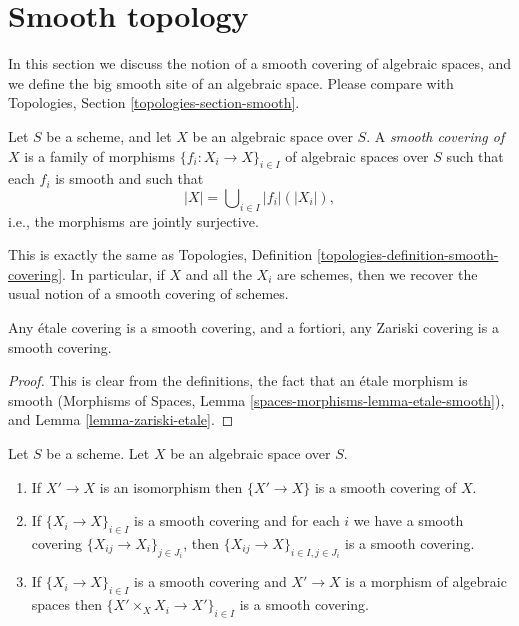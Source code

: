\section{Smooth topology}
\label{section-smooth}

\noindent
In this section we discuss the notion of a smooth covering of
algebraic spaces, and we define the big smooth site of an
algebraic space. Please compare with
Topologies, Section \ref{topologies-section-smooth}.

\begin{definition}
\label{definition-smooth-covering}
Let $S$ be a scheme, and let $X$ be an algebraic space over $S$.
A {\it smooth covering of $X$} is a family of morphisms
$\{f_i : X_i \to X\}_{i \in I}$ of algebraic spaces over $S$
such that each $f_i$ is smooth
and such that
$$
|X| = \bigcup\nolimits_{i \in I} |f_i|(|X_i|),
$$
i.e., the morphisms are jointly surjective.
\end{definition}

\noindent
This is exactly the same as
Topologies, Definition \ref{topologies-definition-smooth-covering}.
In particular, if $X$ and all the $X_i$ are schemes, then we recover the
usual notion of a smooth covering of schemes.

\begin{lemma}
\label{lemma-zariski-etale-smooth}
Any \'etale covering is a smooth covering, and a fortiori,
any Zariski covering is a smooth covering.
\end{lemma}

\begin{proof}
This is clear from the definitions, the fact that an
\'etale morphism is smooth
(Morphisms of Spaces, Lemma \ref{spaces-morphisms-lemma-etale-smooth}), and
Lemma \ref{lemma-zariski-etale}.
\end{proof}

\begin{lemma}
\label{lemma-smooth}
Let $S$ be a scheme.
Let $X$ be an algebraic space over $S$.
\begin{enumerate}
\item If $X' \to X$ is an isomorphism then $\{X' \to X\}$
is a smooth covering of $X$.
\item If $\{X_i \to X\}_{i\in I}$ is a smooth covering and for each
$i$ we have a smooth covering $\{X_{ij} \to X_i\}_{j\in J_i}$, then
$\{X_{ij} \to X\}_{i \in I, j\in J_i}$ is a smooth covering.
\item If $\{X_i \to X\}_{i\in I}$ is a smooth covering
and $X' \to X$ is a morphism of algebraic spaces then
$\{X' \times_X X_i \to X'\}_{i\in I}$ is a smooth covering.
\end{enumerate}
\end{lemma}

